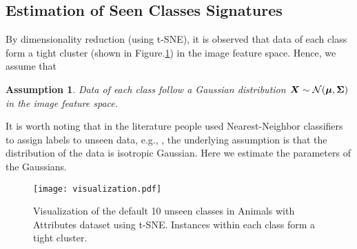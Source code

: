 \documentclass{article}
\newtheorem{as}{Assumption}
\begin{document}

\subsection{Estimation of Seen Classes Signatures}
By dimensionality reduction (using t-SNE\cite{maaten2008visualizing}), it is observed that data of each class form a tight cluster (shown in Figure.\ref{fig:visualization}) in the image feature space. Hence, we assume that
\begin{as}
\label{assum1}
Data of each class follow a Gaussian distribution
$\bm{X}\sim {\cal N}(\bm{\mu},\bm{\Sigma})$ in the image feature space.
\end{as}

It is worth noting that in the literature people used Nearest-Neighbor classifiers to assign labels to unseen data, e.g., \cite{palatucci2009zero} \cite{fu2016semi}, the underlying assumption is that the distribution of the data is isotropic Gaussian. Here we estimate the parameters of the Gaussians.

\begin{figure}[htbp]
  \centering
  \texttt{[image: visualization.pdf]}
  \caption{Visualization of the default 10 unseen classes in Animals with Attributes dataset using t-SNE. Instances within each class form a tight cluster.}
  \label{fig:visualization}
\end{figure}
\end{document}
